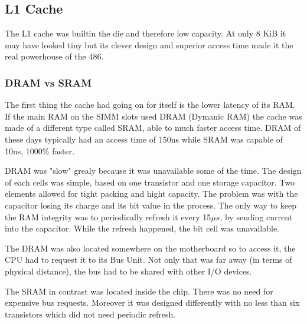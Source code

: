 \subsection{L1 Cache}
The L1 cache was builtin the die and therefore low capacity. At only 8 KiB it may have looked tiny but its clever design and superior access time made it the real powerhouse of the 486.

\subsubsection{DRAM vs SRAM}
The first thing the cache had going on for itself is the lower latency of its RAM. If the main RAM on the SIMM slots used DRAM (Dymanic RAM) the cache was made of a different type called SRAM, able to  much faster access time. DRAM of these days typically had an access time of 150ns while SRAM was capable of 10ns, 1000\% faster.\\
\par
DRAM was "slow" grealy because it was unavailable some of the time. The design of each cells was simple, based on one transistor and one storage capacitor. Two elements allowed for tight packing and hight capacity. The problem was with the capacitor losing its charge and its bit value in the process. The only way to keep the RAM integrity was to periodically refresh it every 15$\mu s$, by sending current into the capacitor. While the refresh happened, the bit cell was unavailable.\\
\par
{}
The DRAM was also located somewhere on the motherboard so to access it, the CPU had to request it to its Bus Unit. Not only that was far away (in terms of physical distance), the bus had to be shared with other I/O devices.\\
\par
The SRAM in contrast was located inside the chip. There was no need for expensive bus requests. Moreover it was designed differently with no less than six transistors which did not need periodic refresh.
\par
{}
\par










